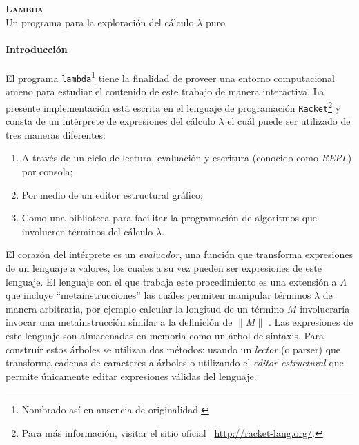\documentclass[letterpaper,twoside,openright,10pt]{book}
\date{}
\begin{document}
\begin{center}
  \vspace*{10pt}
  {\Huge\textbf{\textsc{Lambda}}}\\
  \vspace*{5pt}
  {\large Un programa para la exploración del cálculo \( λ \) puro}
  \vspace*{10pt}
\end{center}

\paragraph{Introducción}

El programa {\tt{}lambda}\footnote{Nombrado así en ausencia de originalidad.} tiene la finalidad de proveer una entorno computacional ameno para estudiar el contenido de este trabajo de manera interactiva. La presente implementación está escrita en el lenguaje de programación {\tt{}Racket}\footnote{Para más información, visitar el sitio oficial ~\url{http://racket-lang.org/}.} y consta de un intérprete de expresiones del cálculo \( λ \) el cuál puede ser utilizado de tres maneras diferentes:

\begin{enumerate}
\item A través de un ciclo de lectura, evaluación y escritura (conocido como \emph{REPL}) por consola;
\item Por medio de un editor estructural gráfico;
\item Como una biblioteca para facilitar la programación de algoritmos que involucren términos del cálculo \( λ \).
\end{enumerate}

El corazón del intérprete es un \emph{evaluador}, una función que transforma expresiones de un lenguaje a valores, los cuales a su vez pueden ser expresiones de este lenguaje. El lenguaje con el que trabaja este procedimiento es una extensión a \( Λ \) que incluye ``metainstrucciones'' las cuáles permiten manipular términos \( λ \) de manera arbitraria, por ejemplo calcular la longitud de un término \( M \) involucraría invocar una metainstrucción similar a la definición de \( \| M \| \) . Las expresiones de este lenguaje son almacenadas en memoria como un árbol de sintaxis. Para construír estos árboles se utilizan dos métodos: usando un \emph{lector} (o parser) que transforma cadenas de caracteres a árboles o utilizando el \emph{editor estructural} que permite únicamente editar expresiones válidas del lenguaje.
\end{document}
